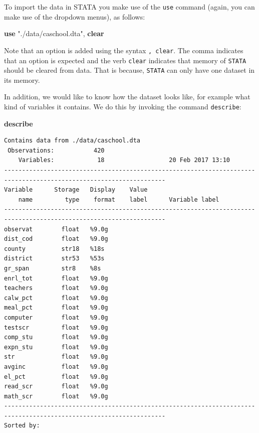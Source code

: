 \documentclass[
]{book}
\newenvironment{Shaded}{\begin{snugshade}}{\end{snugshade}}
\newcommand{\KeywordTok}[1]{\textcolor[rgb]{0.13,0.29,0.53}{\textbf{#1}}}
\newcommand{\NormalTok}[1]{#1}
\newcommand{\StringTok}[1]{\textcolor[rgb]{0.31,0.60,0.02}{#1}}
\begin{document}
To import the data in STATA you make use of the \texttt{use} command (again, you can make use of the dropdown menus), as follows:

\begin{Shaded}
\begin{Highlighting}[]
\KeywordTok{use} \StringTok{"./data/caschool.dta"}\NormalTok{, }\KeywordTok{clear}
\end{Highlighting}
\end{Shaded}

Note that an option is added using the syntax \texttt{,\ clear}. The comma indicates that an option is expected and the verb \texttt{clear} indicates that memory of \texttt{STATA} should be cleared from data. That is because, \texttt{STATA} can only have one dataset in its memory.

In addition, we would like to know how the dataset looks like, for example what kind of variables it contains. We do this by invoking the command \texttt{describe}:

\begin{Shaded}
\begin{Highlighting}[]
\KeywordTok{describe}
\end{Highlighting}
\end{Shaded}

\begin{verbatim}
Contains data from ./data/caschool.dta
 Observations:           420                  
    Variables:            18                  20 Feb 2017 13:10
-------------------------------------------------------------------------------------------------------------------
Variable      Storage   Display    Value
    name         type    format    label      Variable label
-------------------------------------------------------------------------------------------------------------------
observat        float   %9.0g                 
dist_cod        float   %9.0g                 
county          str18   %18s                  
district        str53   %53s                  
gr_span         str8    %8s                   
enrl_tot        float   %9.0g                 
teachers        float   %9.0g                 
calw_pct        float   %9.0g                 
meal_pct        float   %9.0g                 
computer        float   %9.0g                 
testscr         float   %9.0g                 
comp_stu        float   %9.0g                 
expn_stu        float   %9.0g                 
str             float   %9.0g                 
avginc          float   %9.0g                 
el_pct          float   %9.0g                 
read_scr        float   %9.0g                 
math_scr        float   %9.0g                 
-------------------------------------------------------------------------------------------------------------------
Sorted by: 
\end{verbatim}
\end{document}
